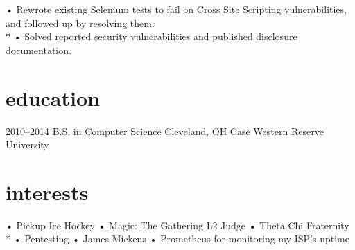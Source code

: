 \documentclass[]{friggeri-cv}
\begin{document}
\begin{entrylist}
{{    %
    •	Rewrote existing Selenium tests to fail on Cross Site Scripting vulnerabilities, and followed up by resolving them.\\*
    •	Solved reported security vulnerabilities and published disclosure documentation.}}
\end{entrylist}

\section{education}

\begin{entrylist}
  \entry
    {2010–2014}
    {B.S. in Computer Science}
    {Cleveland, OH}
    {Case Western Reserve University}
\end{entrylist}

\section{interests}
•	Pickup Ice Hockey
•	Magic: The Gathering L2 Judge
•	Theta Chi Fraternity
\\*
•	Pentesting
•	James Mickens
•	Prometheus for monitoring my ISP's uptime
% 
\end{document}

